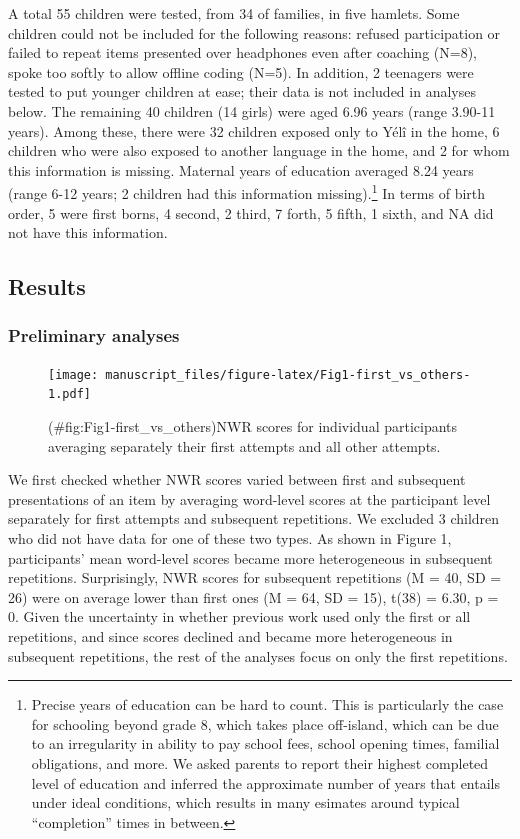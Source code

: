 \documentclass[english,,man,floatsintext]{apa6}
\begin{document}
A total 55 children were tested, from 34 of families, in five hamlets.
Some children could not be included for the following reasons: refused
participation or failed to repeat items presented over headphones even
after coaching (N=8), spoke too softly to allow offline coding (N=5). In
addition, 2 teenagers were tested to put younger children at ease; their
data is not included in analyses below. The remaining 40 children (14
girls) were aged 6.96 years (range 3.90-11 years). Among these, there
were 32 children exposed only to Yélî in the home, 6 children who were
also exposed to another language in the home, and 2 for whom this
information is missing. Maternal years of education averaged 8.24 years
(range 6-12 years; 2 children had this information missing).\footnote{Precise
  years of education can be hard to count. This is particularly the case
  for schooling beyond grade 8, which takes place off-island, which can
  be due to an irregularity in ability to pay school fees, school
  opening times, familial obligations, and more. We asked parents to
  report their highest completed level of education and inferred the
  approximate number of years that entails under ideal conditions, which
  results in many esimates around typical ``completion'' times in
  between.} In terms of birth order, 5 were first borns, 4 second, 2
third, 7 forth, 5 fifth, 1 sixth, and NA did not have this information.

\subsection{Results}\label{results}

\subsubsection{Preliminary analyses}\label{preliminary-analyses}

\begin{figure}
\centering
\texttt{[image: manuscript\_files/figure-latex/Fig1-first\_vs\_others-1.pdf]}
\caption{(\#fig:Fig1-first\_vs\_others)NWR scores for individual
participants averaging separately their first attempts and all other
attempts.}
\end{figure}

We first checked whether NWR scores varied between first and subsequent
presentations of an item by averaging word-level scores at the
participant level separately for first attempts and subsequent
repetitions. We excluded 3 children who did not have data for one of
these two types. As shown in Figure 1, participants' mean word-level
scores became more heterogeneous in subsequent repetitions.
Surprisingly, NWR scores for subsequent repetitions (M = 40, SD = 26)
were on average lower than first ones (M = 64, SD = 15), t(38) = 6.30, p
= 0. Given the uncertainty in whether previous work used only the first
or all repetitions, and since scores declined and became more
heterogeneous in subsequent repetitions, the rest of the analyses focus
on only the first repetitions.
\end{document}
